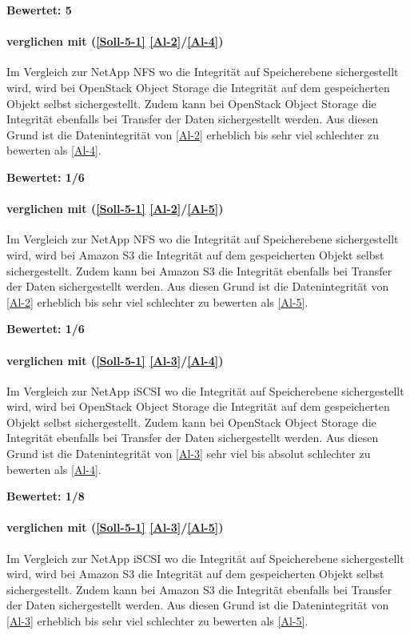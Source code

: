 \textbf{Bewertet: 5}

\paragraph*{  verglichen mit  (\ref{Soll-5-1} \ref{Al-2}/\ref{Al-4})}
Im Vergleich zur NetApp NFS wo die Integrität auf Speicherebene sichergestellt wird, wird bei OpenStack Object Storage die Integrität auf dem gespeicherten Objekt selbst sichergestellt. Zudem kann bei OpenStack Object Storage die Integrität ebenfalls bei Transfer der Daten sichergestellt werden. Aus diesen Grund ist die Datenintegrität von  \ref{Al-2} erheblich bis sehr viel schlechter zu bewerten als  \ref{Al-4}.

\textbf{Bewertet: 1/6}

\paragraph*{  verglichen mit  (\ref{Soll-5-1} \ref{Al-2}/\ref{Al-5})}
Im Vergleich zur NetApp NFS wo die Integrität auf Speicherebene sichergestellt wird, wird bei Amazon S3 die Integrität auf dem gespeicherten Objekt selbst sichergestellt. Zudem kann bei Amazon S3 die Integrität ebenfalls bei Transfer der Daten sichergestellt werden. Aus diesen Grund ist die Datenintegrität von  \ref{Al-2} erheblich bis sehr viel schlechter zu bewerten als  \ref{Al-5}.

\textbf{Bewertet: 1/6}


\paragraph*{  verglichen mit  (\ref{Soll-5-1} \ref{Al-3}/\ref{Al-4})}
Im Vergleich zur NetApp iSCSI wo die Integrität auf Speicherebene sichergestellt wird, wird bei OpenStack Object Storage die Integrität auf dem gespeicherten Objekt selbst sichergestellt. Zudem kann bei OpenStack Object Storage die Integrität ebenfalls bei Transfer der Daten sichergestellt werden. Aus diesen Grund ist die Datenintegrität von  \ref{Al-3} sehr viel bis absolut schlechter zu bewerten als  \ref{Al-4}.

\textbf{Bewertet: 1/8}


\paragraph*{  verglichen mit  (\ref{Soll-5-1} \ref{Al-3}/\ref{Al-5})}
Im Vergleich zur NetApp iSCSI wo die Integrität auf Speicherebene sichergestellt wird, wird bei Amazon S3 die Integrität auf dem gespeicherten Objekt selbst sichergestellt. Zudem kann bei Amazon S3 die Integrität ebenfalls bei Transfer der Daten sichergestellt werden. Aus diesen Grund ist die Datenintegrität von  \ref{Al-3} erheblich bis sehr viel schlechter zu bewerten als  \ref{Al-5}.

